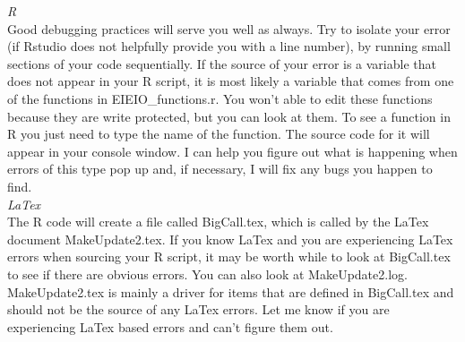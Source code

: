 \documentclass[]{report}
\begin{document}
\textit{R}\\
Good debugging practices will serve you well as always.  Try to isolate your error (if Rstudio does not helpfully provide you with a line number), by running small sections of your code sequentially.  If the source of your error is a variable that does not appear in your R script, it is most likely a variable that comes from one of the functions in EIEIO\_functions.r.  You won't able to edit these functions because they are write protected, but you can look at them.  To see a function in R you just need to type the name of the function.  The source code for it will appear in your console window.  I can help you figure out what is happening when errors of this type pop up and, if necessary, I will fix any bugs you happen to find. \\    

\textit{LaTex}\\
The R code will create a file called BigCall.tex, which is called by the LaTex document MakeUpdate2.tex.  If you know LaTex and you are experiencing LaTex errors when sourcing your R script, it may be worth while to look at BigCall.tex to see if there are obvious errors.  You can also look at MakeUpdate2.log. MakeUpdate2.tex is mainly a driver for items that are defined in BigCall.tex and should not be the source of any LaTex errors.  Let me know if you are experiencing LaTex based errors and can't figure them out. 
\end{document}
